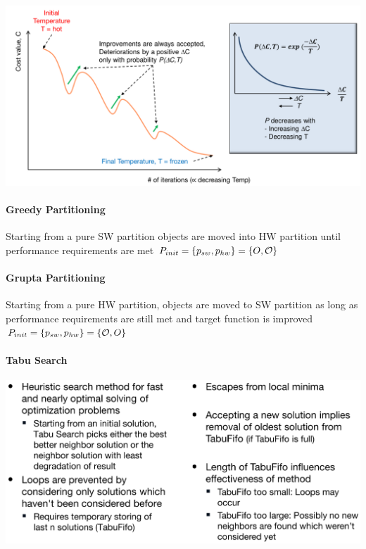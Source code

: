 \documentclass[english]{latex4ei/latex4ei_sheet}
\begin{document}
\begin{center}
  \includegraphics[width=0.8\linewidth]{assets/SimulatedAnnealing.png}
  \label{fig:simulatedannealing}
\end{center}

\paragraph{Greedy Partitioning}
Starting from a pure SW partition objects are moved into HW partition until performance requirements are met
$P_{init} = \{ p_{sw}, p_{hw} \} = \{ O, \operatorname{\mathcal O} \}$

\paragraph{Grupta Partitioning}
Starting from a pure HW partition, objects are moved to SW partition as long as performance requirements are still met and target function is improved
$P_{init} = \{ p_{sw}, p_{hw} \} = \{ \operatorname{\mathcal O}, O \}$

\paragraph{Tabu Search}

\begin{center}
  \centering
  \includegraphics[width=\linewidth]{assets/TabuSearch.png}
  \label{fig:tabusearch}
\end{center}
\end{document}
